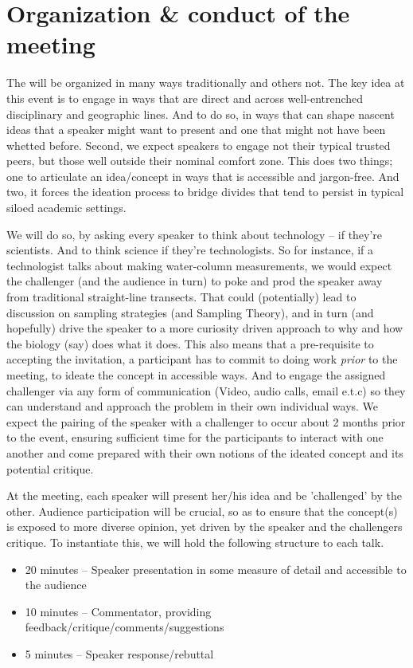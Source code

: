 \section{Organization \& conduct of the meeting}

The \symp will be organized in many ways traditionally and others
not. The key idea at this event is to engage in ways that are direct and
across well-entrenched disciplinary and geographic lines. And to do so,
in ways that can shape nascent ideas that a speaker might want to
present and one that might not have been whetted before. Second, we
expect speakers to engage not their typical trusted peers, but those
well outside their nominal comfort zone. This does two things; one to
articulate an idea/concept in ways that is accessible and
jargon-free. And two, it forces the ideation process to bridge divides
that tend to persist in typical siloed academic settings.

We will do so, by asking every speaker to think about technology -- if
they're scientists. And to think science if they're technologists. So
for instance, if a technologist talks about making water-column
measurements, we would expect the challenger (and the audience in turn)
to poke and prod the speaker away from traditional straight-line
transects. That could (potentially) lead to discussion on sampling
strategies (and Sampling Theory), and in turn (and hopefully) drive the
speaker to a more curiosity driven approach to why and how the biology
(say) does what it does. This also means that a pre-requisite to
accepting the invitation, a participant has to commit to doing work
\emph{prior} to the meeting, to ideate the concept in accessible
ways. And to engage the assigned challenger via any form of
communication (Video, audio calls, email e.t.c) so they can understand
and approach the problem in their own individual ways. We expect the
pairing of the speaker with a challenger to occur about 2 months prior
to the event, ensuring sufficient time for the participants to interact
with one another and come prepared with their own notions of the ideated
concept and its potential critique. 

At the meeting, each speaker will present her/his idea and be
'challenged' by the other. Audience participation will be crucial, so as
to ensure that the concept(s) is exposed to more diverse opinion, yet
driven by the speaker and the challengers critique. To instantiate this,
we will hold the following structure to each talk.

\begin{itemize}[noitemsep,topsep=0pt,parsep=0pt,partopsep=0pt]

\item 20 minutes -- Speaker presentation in some measure of
  detail and accessible to the audience
\item 10 minutes -- Commentator, providing
  feedback/critique/comments/suggestions
\item 5 minutes -- Speaker response/rebuttal

\end{itemize}


